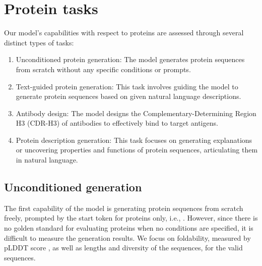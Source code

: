 \section{Protein tasks}
\label{sec:protein}

Our model's capabilities with respect to proteins are assessed through several distinct types of tasks:

\begin{enumerate}
\item Unconditioned protein generation: The model generates protein sequences from scratch without any specific conditions or prompts.
\item Text-guided protein generation: This task involves guiding the model to generate protein sequences based on given natural language descriptions.
\item Antibody design: The model designs the Complementary-Determining Region H3 (CDR-H3) of antibodies to effectively bind to target antigens.
\item Protein description generation: This task focuses on generating explanations or uncovering properties and functions of protein sequences, articulating them in natural language.
\end{enumerate}

\subsection{Unconditioned generation}\label{sec_prot_generation}

The first capability of the model is generating protein sequences from scratch freely, prompted by the start token for proteins only, i.e., . 
However, since there is no golden standard for evaluating proteins when no conditions are specified, it is difficult to measure the generation results. We focus on foldability, measured by pLDDT score \cite{Mariani2013-av}, as well as lengths and diversity of the sequences, for the valid sequences.

